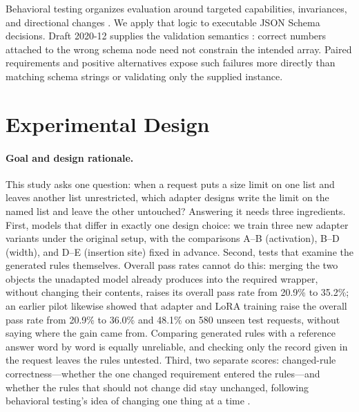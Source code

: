Behavioral testing organizes evaluation around targeted capabilities, invariances, and directional changes \citep{ribeiro2020}. We apply that logic to executable JSON Schema decisions. Draft 2020-12 supplies the validation semantics \citep{jsonschema}: correct numbers attached to the wrong schema node need not constrain the intended array. Paired requirements and positive alternatives expose such failures more directly than matching schema strings or validating only the supplied instance.

\section{Experimental Design}
\paragraph{Goal and design rationale.}
This study asks one question: when a request puts a size limit on one list and leaves another list unrestricted, which adapter designs write the limit on the named list and leave the other untouched? Answering it needs three ingredients. First, models that differ in exactly one design choice: we train three new adapter variants under the original setup, with the comparisons A--B (activation), B--D (width), and D--E (insertion site) fixed in advance. Second, tests that examine the generated rules themselves. Overall pass rates cannot do this: merging the two objects the unadapted model already produces into the required wrapper, without changing their contents, raises its overall pass rate from 20.9\% to 35.2\%; an earlier pilot likewise showed that adapter and LoRA training raise the overall pass rate from 20.9\% to 36.0\% and 48.1\% on 580 unseen test requests, without saying where the gain came from. Comparing generated rules with a reference answer word by word is equally unreliable, and checking only the record given in the request leaves the rules untested. Third, two separate scores: changed-rule correctness---whether the one changed requirement entered the rules---and whether the rules that should not change did stay unchanged, following behavioral testing's idea of changing one thing at a time \citep{ribeiro2020}.

